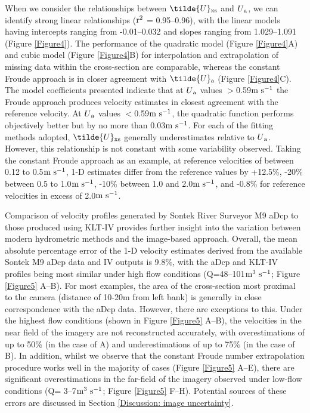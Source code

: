 \documentclass[hess, manuscript]{copernicus} %
\begin{document}
When we consider the relationships between $\tilde{U}\textsubscript{xs}$ and $U\textsubscript{a}$, we can identify strong linear relationships ($\textnormal{r\textsuperscript{2}}$ = 0.95--0.96), with the linear models having intercepts ranging from -0.01--0.032 and slopes ranging from 1.029--1.091 (Figure \ref{Figure4}). The performance of the quadratic model (Figure \ref{Figure4}A) and cubic model (Figure \ref{Figure4}B) for interpolation and extrapolation of missing data within the cross-section are comparable, whereas the constant Froude approach is in closer agreement with $\tilde{U}\textsubscript{a}$ (Figure \ref{Figure4}C). The model coefficients presented indicate that at $U\textsubscript{a}$ values $>$0.59$\textnormal{m s\textsuperscript{-1}}$ the Froude approach produces velocity estimates in closest agreement with the reference velocity. At $U\textsubscript{a}$ values $<$0.59$\textnormal{m s\textsuperscript{-1}}$, the quadratic function performs objectively better but by no more than 0.03$\textnormal{m s\textsuperscript{-1}}$. For each of the fitting methods adopted, $\tilde{U}\textsubscript{xs}$ generally underestimates relative to $U\textsubscript{a}$. However, this relationship is not constant with some variability observed. Taking the constant Froude approach as an example, at reference velocities of between 0.12 to 0.5$\textnormal{m s\textsuperscript{-1}}$, 1-D estimates differ from the reference values by +12.5\%, -20\% between 0.5 to 1.0$\textnormal{m s\textsuperscript{-1}}$, -10\% between 1.0 and 2.0$\textnormal{m s\textsuperscript{-1}}$, and -0.8\% for reference velocities in excess of 2.0$\textnormal{m s\textsuperscript{-1}}$.

Comparison of velocity profiles generated by Sontek River Surveyor M9 aDcp to those produced using KLT-IV provides further insight into the variation between modern hydrometric methods \citep{ISO24578} and the image-based approach. Overall, the mean absolute percentage error of the 1-D velocity estimates derived from the available Sontek M9 aDcp data and IV outputs is 9.8\%, with the aDcp and KLT-IV profiles being most similar under high flow conditions (Q=48--101$\textnormal{m\textsuperscript{3} s\textsuperscript{-1}}$; Figure \ref{Figure5} A--B). For most examples, the area of the cross-section most proximal to the camera (distance of 10-20m from left bank) is generally in close correspondence with the aDcp data. However, there are exceptions to this. Under the highest flow conditions (shown in Figure \ref{Figure5} A--B), the velocities in the near field of the imagery are not reconstructed accurately, with overestimations of up to 50\% (in the case of A) and underestimations of up to 75\% (in the case of B). In addition, whilst we observe that the constant Froude number extrapolation procedure works well in the majority of cases (Figure \ref{Figure5} A--E), there are significant overestimations in the far-field of the imagery observed under low-flow conditions (Q= 3--7$\textnormal{m\textsuperscript{3} s\textsuperscript{-1}}$; Figure \ref{Figure5} F--H). Potential sources of these errors are discussed in Section \ref{Discussion: image uncertainty}.
\end{document}
